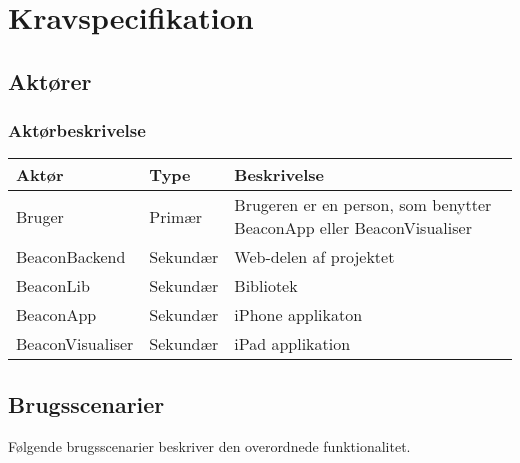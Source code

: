 \chapter{Kravspecifikation}
\label{ch:kravspecifikation}

\section{Aktører}
\subsection{Aktørbeskrivelse}

\begin{table}[h]
\begin{tabular}{@{}lll@{}}
\toprule
\textbf{Aktør} & \textbf{Type} & \textbf{Beskrivelse}                                          \\ \midrule
Bruger         & Primær        & Brugeren er en person, som benytter BeaconApp eller BeaconVisualiser \\ \midrule
BeaconBackend  & Sekundær               & Web-delen af projektet                                        \\ \midrule
BeaconLib      &  Sekundær              & Bibliotek                                                    \\ \midrule
BeaconApp    & Sekundær               & iPhone applikaton                                             \\ \midrule
BeaconVisualiser      & Sekundær               & iPad applikation                                              \\ \bottomrule
\end{tabular}
\end{table}

\section{Brugsscenarier}

Følgende brugsscenarier beskriver den overordnede funktionalitet.

